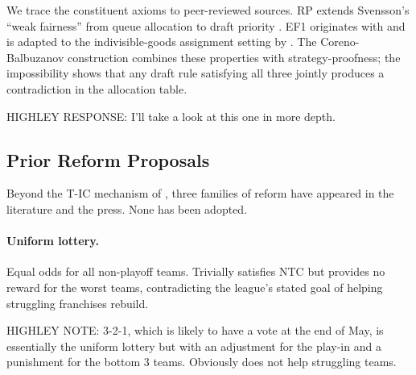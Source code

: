 We trace the constituent axioms to peer-reviewed sources. RP extends Svensson's ``weak fairness'' from queue allocation to draft priority \citep{svensson1994allocation}. EF1 originates with \citet{lipton2004approximately} and is adapted to the indivisible-goods assignment setting by \citet{budish2011combinatorial}. The Coreno-Balbuzanov construction combines these properties with strategy-proofness; the impossibility shows that any draft rule satisfying all three jointly produces a contradiction in the allocation table.


HIGHLEY RESPONSE: I'll take a look at this one in more depth.

\subsection{Prior Reform Proposals}
\label{sec:prior-reform}

Beyond the T-IC mechanism of \citet{munro2020notanking}, three families of reform have appeared in the literature and the press. None has been adopted.

\paragraph{Uniform lottery.} Equal odds for all non-playoff teams. Trivially satisfies NTC but provides no reward for the worst teams, contradicting the league's stated goal of helping struggling franchises rebuild.

HIGHLEY NOTE: 3-2-1, which is likely to have a vote at the end of May, is essentially the uniform lottery but with an adjustment for the play-in and a punishment for the bottom 3 teams. Obviously does not help struggling teams.

